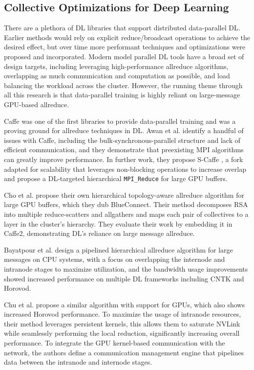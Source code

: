 \subsection{Collective Optimizations for Deep Learning}
There are a plethora of \gls{DL} libraries that support distributed data-parallel DL.
Earlier methods would rely on explicit reduce/broadcast operations to achieve the desired effect, but over time more performant techniques and optimizations were proposed and incorporated.
Modern model parallel \gls{DL} tools have a broad set of design targets, including leveraging high-performance allreduce algorithms, overlapping as much communication and computation as possible, and load balancing the workload across the cluster.
However, the running theme through all this research is that data-parallel training is highly reliant on large-message \gls{GPU}-based allreduce. 

Caffe was one of the first libraries to provide data-parallel training and was a proving ground for allreduce techniques in \gls{DL}.
Awan et al. \cite{Awan2017InDepthPerfCharOfDNN} identify a handful of issues with Caffe, including the bulk-synchronous-parallel structure and lack of efficient communication, and they demonstrate that preexisting \gls{MPI} algorithms can greatly improve performance.
In further work, they propose S-Caffe \cite{Awan2017SCaffe}, a fork adapted for scalability that leverages non-blocking operations to increase overlap and propose a \gls{DL}-targeted hierarchical \texttt{MPI\_Reduce} for large \gls{GPU} buffers.

Cho et al. \cite{Cho2019BlueConnect} propose their own hierarchical topology-aware allreduce algorithm for large \gls{GPU} buffers, which they dub BlueConnect. 
Their method decomposes \gls{RSA} into multiple reduce-scatters and allgathers and maps each pair of collectives to a layer in the cluster's hierarchy.
They evaluate their work by embedding it in Caffe2, demonstrating \gls{DL}'s reliance on large message allreduce.

Bayatpour et al. \cite{Bayatpour2018SALaR} design a pipelined hierarchical allreduce algorithm for large messages on \gls{CPU} systems, with a focus on overlapping the internode and intranode stages to maximize utilization, and the bandwidth usage improvements showed increased performance on multiple \gls{DL} frameworks including \gls{CNTK} and Horovod. 

Chu et al. \cite{Chu2020NVGroup} propose a similar algorithm with support for \gls{GPU}s, which also shows increased Horovod performance.
To maximize the usage of intranode resources, their method leverages persistent kernels, this allows them to saturate NVLink while seamlessly performing the local reduction, significantly increasing overall performance. 
To integrate the \gls{GPU} kernel-based communication with the network, the authors define a communication management engine that pipelines data between the intranode and internode stages.

